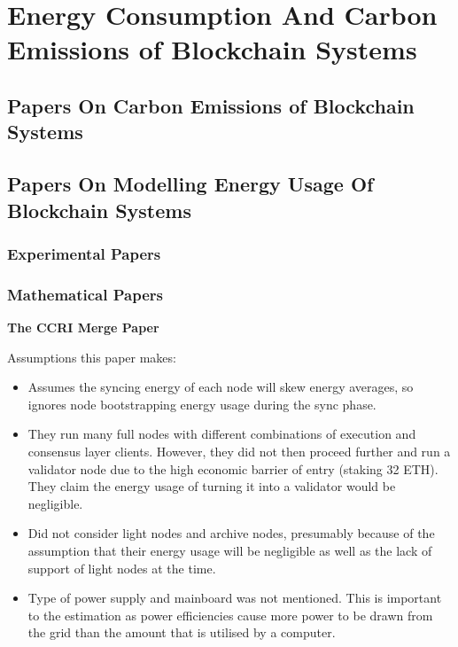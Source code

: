 \section{Energy Consumption And Carbon Emissions of Blockchain Systems}




\subsection{Papers On Carbon Emissions of Blockchain Systems}



\subsection{Papers On Modelling Energy Usage Of Blockchain Systems}



\subsubsection{Experimental Papers}




\subsubsection{Mathematical Papers}




\textbf{The CCRI Merge Paper } \cite{CCRI:Network}

Assumptions this paper makes:
\begin{itemize}
    \item Assumes the syncing energy of each node will skew energy averages, so ignores node bootstrapping energy usage during the sync phase.
    
    \item They run many full nodes with different combinations of execution and consensus layer clients. However, they did not then proceed further and run a validator node due to the high economic barrier of entry (staking 32 ETH). They claim the energy usage of turning it into a validator would be negligible.
    
    \item Did not consider light nodes and archive nodes, presumably because of the assumption that their energy usage will be negligible as well as the lack of support of light nodes at the time.

    \item Type of power supply and mainboard was not mentioned. This is important to the estimation as power efficiencies cause more power to be drawn from the grid than the amount that is utilised by a computer.
\end{itemize}

